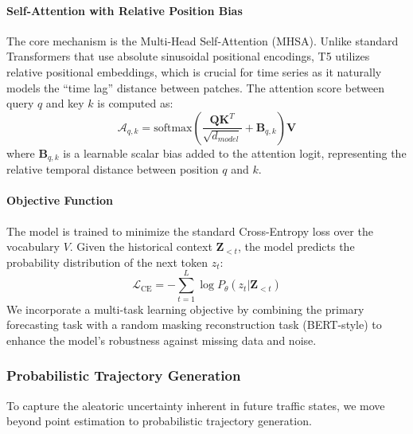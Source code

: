 \documentclass{article}
\begin{document}
\paragraph{Self-Attention with Relative Position Bias}
The core mechanism is the Multi-Head Self-Attention (MHSA). Unlike standard Transformers that use absolute sinusoidal positional encodings, T5 utilizes relative positional embeddings, which is crucial for time series as it naturally models the ``time lag'' distance between patches. The attention score between query $q$ and key $k$ is computed as:
\begin{equation}
    \mathcal{A}_{q,k} = \text{softmax}\left( \frac{\mathbf{Q}\mathbf{K}^T}{\sqrt{d_{model}}} + \mathbf{B}_{q,k} \right) \mathbf{V}
\end{equation}
where $\mathbf{B}_{q,k}$ is a learnable scalar bias added to the attention logit, representing the relative temporal distance between position $q$ and $k$.

\paragraph{Objective Function}
The model is trained to minimize the standard Cross-Entropy loss over the vocabulary $V$. Given the historical context $\mathbf{Z}_{<t}$, the model predicts the probability distribution of the next token $z_t$:
\begin{equation}
    \mathcal{L}_{\text{CE}} = - \sum_{t=1}^{L} \log P_{\theta}(z_t | \mathbf{Z}_{<t})
\end{equation}
We incorporate a multi-task learning objective by combining the primary forecasting task with a random masking reconstruction task (BERT-style) to enhance the model's robustness against missing data and noise.

\subsubsection{Probabilistic Trajectory Generation}
To capture the aleatoric uncertainty inherent in future traffic states, we move beyond point estimation to probabilistic trajectory generation.
\end{document}
